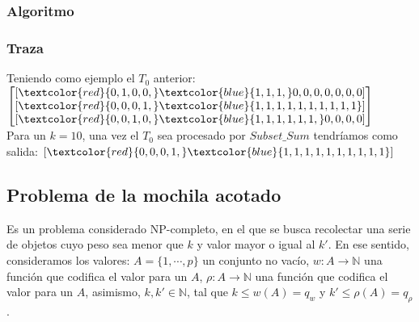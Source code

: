 \documentclass[12pt]{beamer}
\begin{document}
 \begin{frame}
     \frametitle{Algoritmo}
     \begin{algorithmic}[1]
        \EndProcedure
    \end{algorithmic}
 \end{frame}
 \begin{frame}
     \frametitle{Traza}
     Teniendo como ejemplo el $T_0$ anterior:
     $
        \begin{bmatrix}
            [\textcolor{red}{0, 1, 0, 0,} \textcolor{blue}{1, 1, 1,} 0, 0, 0, 0, 0, 0, 0] \\
            [\textcolor{red}{0, 0, 0, 1,} \textcolor{blue}{1, 1, 1, 1, 1, 1, 1, 1, 1, 1}] \\
            [\textcolor{red}{0, 0, 1, 0,} \textcolor{blue}{1, 1, 1, 1, 1, 1,} 0, 0, 0, 0]
        \end{bmatrix}
    $
    \\
    Para un $k=10$, una vez el $T_0$ sea procesado por $Subset\_Sum$ tendríamos como salida: $[\textcolor{red}{0, 0, 0, 1,} \textcolor{blue}{1, 1, 1, 1, 1, 1, 1, 1, 1, 1}]$
 \end{frame}
 \begin{frame}
    \section{Problema de la mochila acotado}
    Es un problema considerado NP-completo, en el que se busca recolectar una serie de objetos cuyo peso sea menor que $k$ y valor mayor o igual al $k'$. En ese sentido, consideramos los valores: $A=\{1,\cdots,p\}$ un conjunto no vacío, $w:A\rightarrow\mathbb{N}$ una función que codifica el valor para un $A$, $\rho:A\rightarrow\mathbb{N}$ una función que codifica el valor para un $A$, asimismo, $k,k'\in\mathbb{N}$, tal que $k\leq w(A)=q_w$ y $k'\leq \rho(A)=q_\rho$.
 \end{frame}
 \begin{frame}
    \begin{algorithmic}[1]
        \EndFor
        \EndFor
        \EndProcedure
    \end{algorithmic}
 \end{frame}
\end{document}
